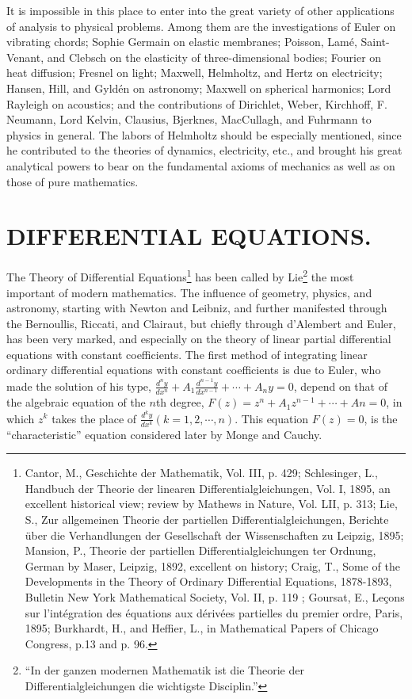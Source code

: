 \documentclass[oneside]{book}
\begin{document}
{It is impossible in this place to enter into the great variety of
other applications of analysis to physical problems. Among them are
the investigations of Euler on vibrating chords; Sophie Germain on
elastic membranes; Poisson, Lam\'e, Saint-Venant, and Clebsch on
the elasticity of three-dimensional bodies; Fourier on heat
diffusion; Fresnel on light; Maxwell, Helmholtz, and Hertz on
electricity; Hansen, Hill, and Gyld\'en on astronomy; Maxwell on
spherical harmonics; Lord Rayleigh on acoustics; and the
contributions of Dirichlet, Weber, Kirchhoff, F. Neumann, Lord
Kelvin, Clausius, Bjerknes, MacCullagh, and Fuhrmann to physics in
general. The labors of Helmholtz should be especially mentioned,
since he contributed to the theories of dynamics, electricity, etc.,
and brought his great analytical powers to bear on the fundamental
axioms of mechanics as well as on those of pure mathematics.

\chapter{DIFFERENTIAL EQUATIONS.}

The Theory of Differential Equations\footnote{Cantor, M.,
Geschichte der Mathematik, Vol. III, p. 429; Schlesinger, L.,
Handbuch der
Theorie der linearen Differentialgleichungen, Vol. I, 1895, an
excellent historical view; review by Mathews in Nature, Vol. LII,
p. 313; Lie, S., Zur allgemeinen Theorie der partiellen
Differentialgleichungen, Berichte \"uber die Verhandlungen der
Gesellschaft der Wissenschaften zu Leipzig, 1895; Mansion, P.,
Theorie der partiellen Differentialgleichungen ter Ordnung, German
by Maser, Leipzig, 1892, excellent on history; Craig, T., Some of
the Developments in the Theory of Ordinary Differential Equations,
1878-1893, Bulletin New York Mathematical Society, Vol. II, p. 119 ;
Goursat, E., Le\c{c}ons sur l'int\'egration des \'equations aux
d\'eriv\'ees partielles du premier ordre, Paris, 1895; Burkhardt,
H., and Heffier, L., in Mathematical Papers of Chicago Congress,
p.13 and p. 96.} has been called by Lie\footnote{``In der ganzen
modernen Mathematik ist die Theorie der Differentialgleichungen die
wichtigste Disciplin.''} the most important of modern
mathematics. The influence of geometry, physics, and astronomy,
starting with Newton and Leibniz, and further manifested through the
Bernoullis, Riccati, and Clairaut, but chiefly through d'Alembert
and Euler, has been very marked, and especially on the theory of
linear partial differential equations with constant coefficients.
The first method of integrating linear ordinary differential
equations with constant coefficients is due to Euler, who made the
solution of his type, $\frac {d^{n}y} {dx^{n}} + A_{1}\frac
{d^{n-1}y} {dx^{n-1}} + \cdots + A_{n}y = 0$, depend on that of the
algebraic equation of the
$n$th degree, $F(z) = z^{n} + A_{1}z^{n-1} + \cdots + An = 0$, in
which $z^{k}$ takes the place of $\frac {d^{k}y} {dx^{k}} (k = 1, 2,
\cdots, n)$. This equation $F(z) = 0$, is the ``characteristic''
equation considered later by Monge and Cauchy.

}
\end{document}
